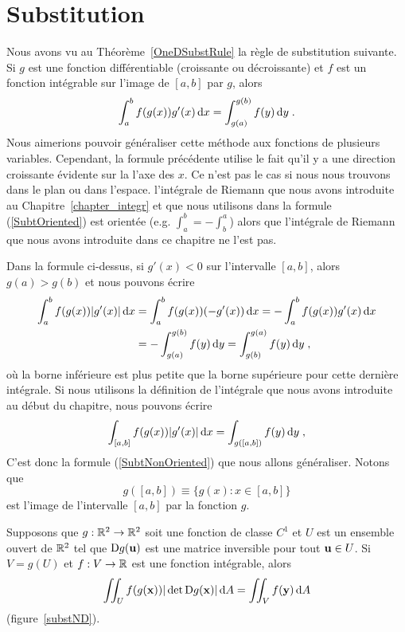 {\section{Substitution}

Nous avons vu au Théorème~\ref{OneDSubstRule} la règle de substitution
suivante.  Si $g$ est une fonction différentiable (croissante ou
décroissante) et $f$ est un fonction intégrable sur l'image de $[a,b]$
par $g$, alors
\begin{equation}\label{SubtOriented}
\int_a^b f(g(x))g'(x)  \,\mathrm{d}x = \int_{g(a)}^{g(b)} f(y) \,\mathrm{d}y \; .
\end{equation}
Nous aimerions pouvoir généraliser cette méthode aux fonctions de
plusieurs variables.  Cependant, la formule précédente utilise le fait
qu'il y a une direction croissante évidente sur la l'axe des $x$.  Ce
n'est pas le cas si nous nous trouvons dans le plan ou dans l'espace.
l'intégrale de Riemann que nous avons introduite au
Chapitre~\ref{chapter_integr} et que nous utilisons dans la formule
(\ref{SubtOriented}) est orientée
(e.g. $\displaystyle \int_a^b = - \int_b^a$) alors que l'intégrale de
Riemann que nous avons introduite dans ce chapitre ne l'est pas.

Dans la formule ci-dessus, si $g'(x) < 0$ sur l'intervalle $[a,b]$,
alors $g(a) > g(b)$ et nous pouvons écrire
\begin{align*}
\int_a^b f(g(x)) |g'(x)|  \,\mathrm{d}x &=
\int_a^b f(g(x)) (-g'(x))  \,\mathrm{d}x = - \int_a^b f(g(x)) g'(x)  \,\mathrm{d}x \\
&= -\int_{g(a)}^{g(b)} f(y) \,\mathrm{d}y = \int_{g(b)}^{g(a)} f(y) \,\mathrm{d}y \; ,
\end{align*}
où la borne inférieure est plus petite que la borne supérieure pour
cette dernière intégrale.  Si nous utilisons la définition de
l'intégrale que nous avons introduite au début du chapitre, nous
pouvons écrire
\begin{equation}\label{SubtNonOriented}
  \int_{[a,b]} f(g(x)) |g'(x)|  \,\mathrm{d}x = \int_{g([a,b])} f(y) \,\mathrm{d}y \; ,
\end{equation}
C'est donc la formule (\ref{SubtNonOriented}) que nous allons
généraliser.   Notons que
\[
  g([a,b]) \equiv \{ g(x) : x \in [a,b] \}
\]
est l'image de l'intervalle $[a,b]$ par la fonction $g$.

\begin{focus}{\thm}
Supposons que $g:\mathbb{R}^2 \to \mathbb{R}^2$ soit une fonction de classe $C^1$ et
$U$ est un ensemble ouvert de $\mathbb{R}^2$ tel que $\mathrm{D} g(\mathbf{u})$ est
une matrice inversible pour tout $\mathbf{u} \in U$.  Si $V = g(U)$ et
$f:V \to \mathbb{R}$ est une fonction intégrable, alors
\[
  \iint_{U} f(g(\mathbf{x})) |\det \mathrm{D} g(\mathbf{x})| \,\mathrm{d}A =
  \iint_{V} f(\mathbf{y}) \,\mathrm{d}A
\]
(figure~\ref{substND}).
\label{NDSubstRule}
\end{focus}

}
